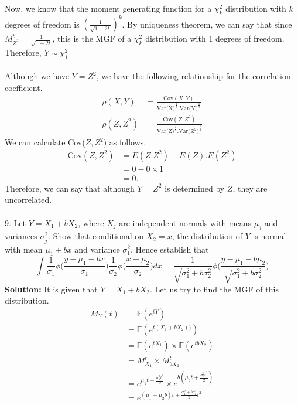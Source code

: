 \documentclass[11pt]{article}
\begin{document}
Now, we know that the moment generating function for a $\chi^{2}_{k}$ distribution with $k$ degrees of freedom is $(\frac{1}{\sqrt{1-2t}})^{k}$. By uniqueness theorem, we can say that since $M_{Z^{2}}^{t} = \frac{1}{\sqrt{1-2t}}$, this is the MGF of a $\chi^{2}_{k}$ distribution with 1 degrees of freedom. Therefore, $Y \sim \chi^{2}_{1}$ \\ \\
Although we have $Y = Z^{2}$, we have the following relationship for the correlation coefficient.
\begin{equation}
  \nonumber
  \begin{aligned}
    \rho(X, Y) & = \frac{\text{Cov}(X, Y)}{\text{Var(X)}^{\frac{1}{2}}.\text{Var(Y)}^{\frac{1}{2}}}\\
    \rho(Z, Z^{2}) & = \frac{\text{Cov}(Z, Z^{2})}{\text{Var(Z)}^{\frac{1}{2}}.\text{Var($Z^{2}$)}^{\frac{1}{2}}}
  \end{aligned}
\end{equation}
We can calculate Cov($Z, Z^{2}$) as follows.
\begin{equation}
  \nonumber
  \begin{aligned}
    \text{Cov}(Z, Z^{2}) & =  E(Z.Z^{2}) - E(Z).E(Z^{2})\\
    & = 0 - 0 \times 1\\
    & = 0.
  \end{aligned}
\end{equation}
Therefore, we can say that although $Y = Z^{2}$ is determined by $Z$, they are uncorrelated.\\ \\
9. Let $Y = X_{1} + bX_{2}$, where $X_{j}$ are independent normals with means $\mu_{j}$ and variances $\sigma_{j}^{2}$. Show that conditional on $X_{2} = x$, the distribution of $Y$ is normal with mean $\mu_{1} + bx$ and variance $\sigma_{1}^{2}$. Hence establish that
\begin{equation}
  \nonumber
  \int \frac{1}{\sigma_{1}} \phi\bigg(\frac{y - \mu_{1} - bx}{\sigma_{1}}\bigg) \frac{1}{\sigma_{2}} \phi\bigg(\frac{x - \mu_{2}}{\sigma_{2}}\bigg)dx = \frac{1}{\sqrt{\sigma_{1}^{2} + b \sigma_{2}^{2}}} \phi \bigg(\frac{y - \mu_{1} - b \mu_{2}}{\sqrt{\sigma_{1}^{2} + b \sigma_{2}^{2}}}\bigg)
\end{equation}
\textbf{Solution:} It is given that $Y = X_{1} + bX_{2}$. Let us try to find the MGF of this distribution.
\begin{equation}
  \nonumber
  \begin{aligned}
    M_{Y}(t) & = \mathbb{E}(e^{tY})\\
    & = \mathbb{E}(e^{t(X_{1} + bX_{2}))})\\
    & = \mathbb{E}(e^{tX_{1}}) \times \mathbb{E}(e^{tbX_{2}}) \\
    & = M_{X_{1}}^{t} \times M_{bX_{2}}^{t} \\
    & = e^{\mu_{1}t + \frac{\sigma_{1}^{2} t^{2}}{2}} \times e^{b(\mu_{2}t + \frac{\sigma_{2}^{2} t^{2}}{2})}\\
    & = e^{(\mu_{1} + \mu_{2}b)t + \frac{\sigma_{1}^{2} + b\sigma_{2}^{2}}{2}t^{2}}\\
  \end{aligned}
\end{equation}
\end{document}
